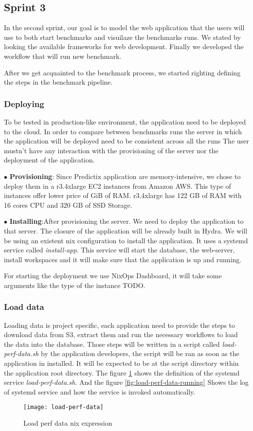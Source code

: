 \subsection{Sprint 3}
In the second sprint, our goal is to model the web application that the users
will use to both start benchmarks and visuilaze the benchmarks runs. We stated
by looking the available frameworks for web development. Finally we developed
the workflow that will run new benchmark.

After we get acquainted to the benchmark process, we started righting defining
the steps in the benchmark pipeline. 
\subsubsection{Deploying}
To be tested in production-like environment, the
application need to be deployed to the cloud. In order to compare between
benchmarks runs the server in which the application will be deployed need to be
consistent across all the runs The user mustn't have any interaction with the
provisioning of the server nor the deployment of the application. 

$\bullet$ \textbf{Provisioning}: Since Predictix application are
memory-intensive, we chose to deploy them in a r3.4xlarge EC2 instances from
Amazon AWS. This type of instances offer lower price of GiB of RAM. r3.4xlarge
has 122 GB of RAM with 16 cores CPU and 320 GB of SSD Storage.

$\bullet$ \textbf{Installing}:After provisioning the server. We need to deploy
the application to that server. The closure of the application will be already
built in Hydra. We will be using an existent nix configuration to install the
application. It uses a systemd service called \emph{install-app}. This service
will start the database, the web-server, install workspaces and it will make
sure that the application is up and running.

For starting the deployment we use NixOps Dashboard, it will take
some arguments like the type of the instance TODO.

\subsubsection{Load data}
Loading data is project specific, each application need to provide the steps to
download data from S3, extract them and run the necessary workflows to load the
data into the database. Those steps will be written in a script called
\emph{load-perf-data.sh} by the application developers, the script will be ran as
soon as the application in installed. It will be expected to be at the script
directory within the application root directory. The figure
\hyperref[fig:load-perf-data]{\ref{fig:load-perf-data}} shows the definition of
the systemd service \emph{load-perf-data.sh}. And the figure
\hyperref[fig:load-perf-data-running]{\ref{fig:load-perf-data-running}} Shows
the log of systemd service and how the service is invoked automatically.
\begin{figure}[h]
  \texttt{[image: load-perf-data]}
\caption{Load perf data nix expression}
\label{fig:load-perf-data}
\end{figure}

